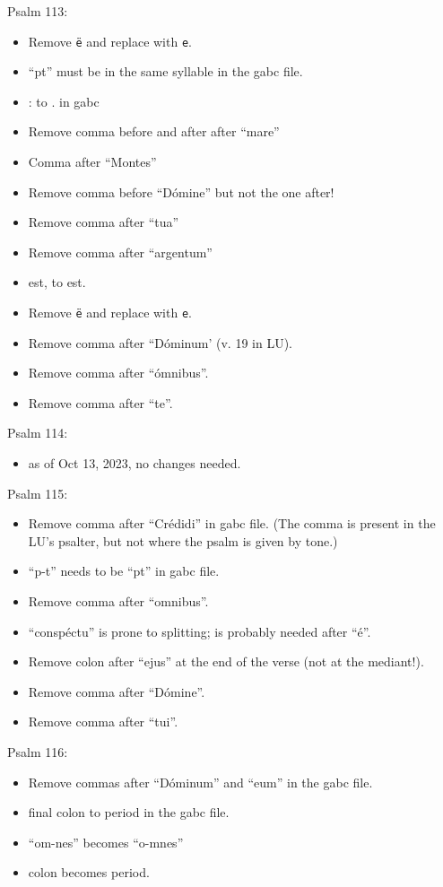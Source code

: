 \documentclass[11pt]{article}
\begin{document}
 Psalm 113:
  \begin{itemize}
   \item Remove \texttt{ë} and replace with \texttt{e}.
    \item ``pt'' must be in the same syllable in the gabc file.
    \item
    : to . in gabc
       \item  Remove comma before and after after ``mare''
       \item
       Comma after ``Montes''
  \item Remove comma before ``Dómine'' but not the one after!
    \item
  Remove comma after ``tua''
  \item
  Remove comma after ``argentum''
  \item
  est, to est.
\item Remove \texttt{ë} and replace with \texttt{e}.
\item Remove comma after ``Dóminum' (v. 19 in LU).
   \item
 Remove comma after ``ómnibus''.
   \item
 Remove comma after ``te''.
 \end{itemize}
 
  Psalm 114:
  \begin{itemize}
  \item as of Oct 13, 2023, no changes needed.
    \end{itemize}
 
 Psalm 115:
 \begin{itemize}
 \item Remove comma after ``Crédidi'' in gabc file. (The comma is present in the LU's psalter, but not where the psalm is given by tone.)
 \item
 ``p-t'' needs to be ``pt'' in gabc file.
    \item  Remove comma after ``omnibus''.
 \item
 ``conspéctu'' is prone to splitting; \verb|| is probably needed after ``é''.
   \item
 Remove colon after ``ejus'' at the end of the verse (not at the mediant!).
  \item
 Remove comma after ``Dómine''.
 \item
 Remove comma after ``tui''.
 \end{itemize}
 
    Psalm 116:
  \begin{itemize}
 \item Remove commas after ``Dóminum'' and ``eum'' in the gabc file.
 \item
final colon to period in the gabc file.
 \item
 ``om-nes'' becomes  ``o-mnes''
 \item
 colon becomes period.
\end{itemize}
\end{document}

